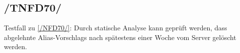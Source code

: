 \subsection*{/TNFD70/}
\label{/TNFD70/} Testfall zu \ref{/NFD70/}: Durch \gls{statische Analyse} kann geprüft werden, dass abgelehnte \Glspl{Alias-Vorschlag} nach spätestens einer Woche vom \Gls{Server} gelöscht werden.